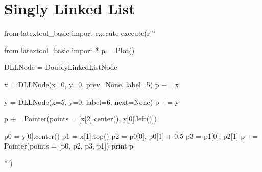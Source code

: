 \section{Singly Linked List}

\begin{python}
from latextool_basic import execute
execute(r'''

from latextool_basic import *
p = Plot()

DLLNode = DoublyLinkedListNode

x = DLLNode(x=0, y=0, prev=None, label=5)
p += x

y = DLLNode(x=5, y=0, label=6, next=None)
p += y

p += Pointer(points = [x[2].center(), y[0].left()])

p0 = y[0].center()
p1 = x[1].top()
p2 = p0[0], p0[1] + 0.5
p3 = p1[0], p2[1]
p += Pointer(points = [p0, p2, p3, p1])
print p

''')
\end{python}

